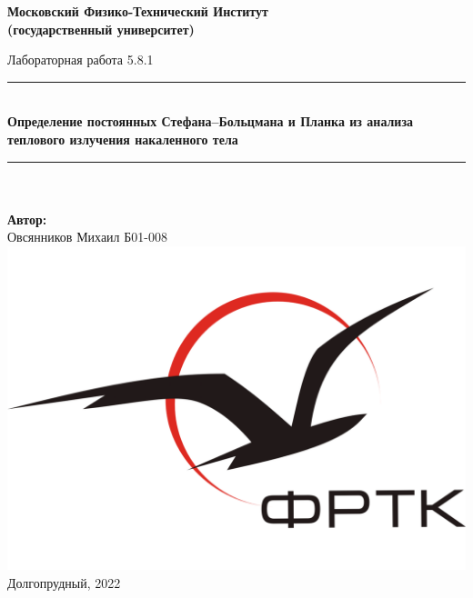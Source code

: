 \newcommand{\HRule}{\rule{\linewidth}{0.7mm}} %

\begin{center}
	\large\textbf{Московский Физико-Технический Институт}\\
	\large\textbf{(государственный университет)}
	
	\vfill
	
	
	
	\Large Лабораторная работа 5.8.1
	
	\HRule
	\\[0.4cm]
	{ \huge \bfseries Определение постоянных Стефана–Больцмана и Планка из анализа теплового излучения накаленного тела}
	\\[0.4cm] %
	\HRule
	\\[0.5cm]
	
	\ \\
	\textbf{\large Автор:} \\	
	\large Овсянников Михаил Б01-008\\
	\vfill
	\hspace*{-0.8 cm}\includegraphics[width=100 pt]{./Include/frkt_logo.pdf}\\
	\large Долгопрудный, 2022
\end{center}

\thispagestyle{empty}

\newpage
\setcounter{page}{2}
\fancyfoot[c]{\thepage}
